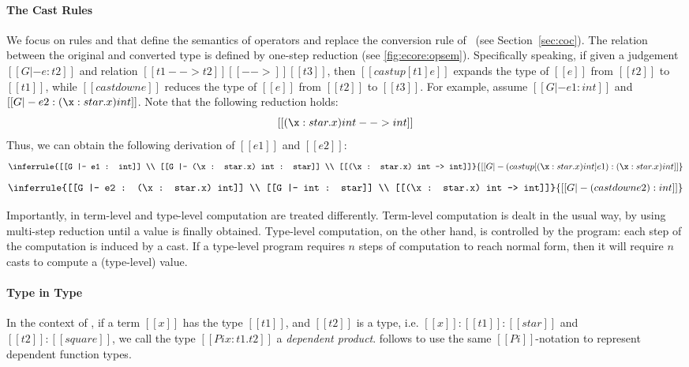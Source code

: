\paragraph{The Cast Rules}
We focus on rules  and  that
define the semantics of \cast operators and replace the conversion
rule of \cc~(see Section~\ref{sec:coc}). The relation between the original
and converted type is defined by one-step reduction (see
\ref{fig:ecore:opsem}). Specifically speaking, if given a judgement
$[[G |- e : t2]]$ and relation $[[t1 --> t2]] [[-->]] [[t3]]$, then
$[[castup [t1] e]]$ expands the type of $[[e]]$ from $[[t2]]$ to
$[[t1]]$, while $[[castdown e]]$ reduces the type of $[[e]]$ from
$[[t2]]$ to $[[t3]]$. For example, assume $[[G |- e1 : int]]$ and $[[G |- e2 :
(\x : star.x) int]]$. Note that the following reduction holds:
\[ [[(\x : star.x) int --> int]]\]
Thus, we can obtain the following derivation of $[[e1]]$ and $[[e2]]$:
\[
\inferrule{[[G |- e1 : int]] \\ [[G |- (\x : star.x) int : star]] \\ [[(\x :
star.x) int --> int]]}{[[G |- (castup[(\x : star.x) int] e1):(\x : star.x)
int]]}
\]
\[
\inferrule{[[G |- e2 : (\x : star.x) int]] \\ [[G |- int : star]] \\ [[(\x :
star.x) int --> int]]}{[[G |- (castdown e2):int]]}
\]

 

Importantly, in \ecore term-level and type-level computation are treated 
differently. Term-level computation is dealt in the usual way, by 
using multi-step reduction until a value is finally obtained. 
Type-level computation, on the other hand, is controlled by the program:
each step of the computation is induced by a cast. If a type-level 
program requires $n$ steps of computation to reach normal form, 
then it will require $n$ casts to compute a (type-level) value.

\paragraph{Type in Type}
 
In the context of \cc, if a term $[[x]]$ has the type $[[t1]]$, and
$[[t2]]$ is a type, i.e. $[[x]]:[[t1]]:[[star]]$ and
$[[t2]]:[[square]]$, we call the type $[[Pi x:t1.t2]]$ a
\emph{dependent product}. \ecore follows \cc to use the same
$[[Pi]]$-notation to represent dependent function types.

